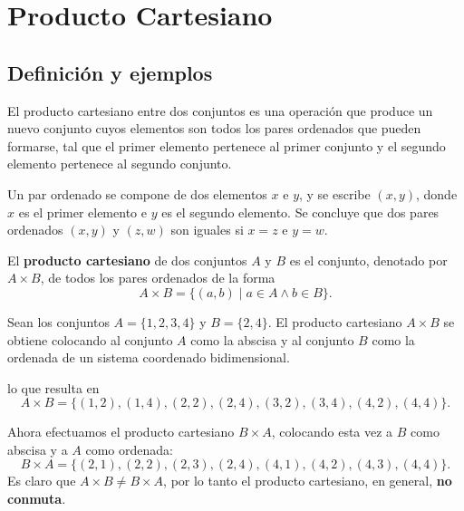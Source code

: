 \chapter{Producto Cartesiano}

\section{Definición y ejemplos}

El producto cartesiano entre dos conjuntos es una operación que produce un
nuevo conjunto cuyos elementos son todos los pares ordenados que pueden
formarse, tal que el primer elemento pertenece al primer conjunto y el
segundo elemento pertenece al segundo conjunto.

\begin{definicion}
Un par ordenado se compone de dos elementos $x$ e $y$, y se escribe
$(x,y)$, donde $x$ es el primer elemento e $y$ es el segundo elemento. Se
concluye que dos pares ordenados $(x,y)$ y $(z,w)$ son iguales si $x=z$ e
$y=w$.
\end{definicion}

\begin{definicion}
El \textbf{producto cartesiano} de dos conjuntos $A$ y $B$ es el conjunto,
denotado por $A \times B$, de todos los pares ordenados de la forma
\[
A \times B = \{ (a,b) \mid a \in A \wedge b \in B \}.
\]
\end{definicion}

\begin{ejemplo}
Sean los conjuntos $A = \{1,2,3,4\}$ y $B = \{2,4\}$. El producto cartesiano
$A \times B$ se obtiene colocando al conjunto $A$ como la abscisa y al
conjunto $B$ como la ordenada de un sistema coordenado bidimensional.

\begin{center}
\end{center}

lo que resulta en
\[
A \times B = \{(1,2),(1,4),(2,2),(2,4),(3,2),(3,4),(4,2),(4,4)\}.
\]

Ahora efectuamos el producto cartesiano $B \times A$, colocando esta vez a
$B$ como abscisa y a $A$ como ordenada:
\[
B \times A = \{(2,1),(2,2),(2,3),(2,4),(4,1),(4,2),(4,3),(4,4)\}.
\]
Es claro que $A \times B \neq B \times A$, por lo tanto el producto
cartesiano, en general, \textbf{no conmuta}.
\end{ejemplo}

